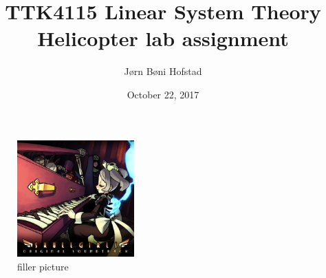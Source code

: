 \documentclass[11pt, a4paper, USenglish]{article} %
\begin{document}
\title{TTK4115 Linear System Theory\\
    \large Helicopter lab assignment \\
}
\author{Jørn Bøni Hofstad}
\date{October 22, 2017}
\begin{titlepage}
    \maketitle
    \begin{figure}
    \centering
    \includegraphics[width=0.4\textwidth]{figures/itk_ntnu}\\
    filler picture
    \end{figure}
    \thispagestyle{empty}
\end{titlepage}

\newpage

\thispagestyle{empty} %

\newpage
\tableofcontents
\thispagestyle{empty} %
\newpage
\setcounter{page}{1}



\newpage
\label{sec:bibliography}
\end{document}
